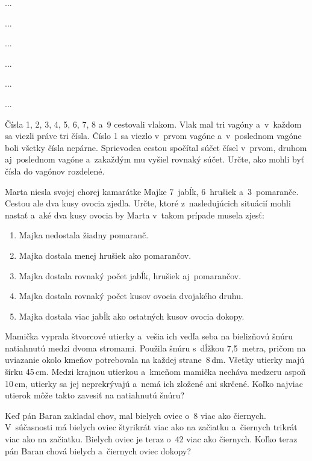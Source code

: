 ﻿{%
...}

{%
...}

{%
...}

{%
...}

{%
...}

{%
...}

{%
Čísla 1, 2, 3, 4, 5, 6, 7, 8 a~9 cestovali vlakom.
Vlak mal tri vagóny a~v~každom sa viezli práve tri čísla.
Číslo 1 sa viezlo v~prvom vagóne a~v~poslednom vagóne boli všetky čísla nepárne.
Sprievodca cestou spočítal súčet čísel v~prvom, druhom aj~poslednom vagóne a~zakaždým mu vyšiel rovnaký súčet.
Určte, ako mohli byť čísla do vagónov rozdelené.
}

{%
Marta niesla svojej chorej kamarátke Majke 7~jabĺk, 6~hrušiek a~3~pomaranče.
Cestou ale dva kusy ovocia zjedla.
Určte, ktoré z~nasledujúcich situácií mohli nastať a~aké dva kusy ovocia by
Marta v~takom prípade musela zjesť:
\begin{enumerate}\alphatrue
\item Majka nedostala žiadny pomaranč.
\item Majka dostala menej hrušiek ako pomarančov.
\item Majka dostala rovnaký počet jabĺk, hrušiek aj~pomarančov.
\item Majka dostala rovnaký počet kusov ovocia dvojakého druhu.
\item Majka dostala viac jabĺk ako ostatných kusov ovocia dokopy.
\end{enumerate}
}

{%
Mamička vyprala štvorcové utierky a~vešia ich vedľa seba na bielizňovú šnúru natiahnutú medzi dvoma stromami.
Použila šnúru s~dĺžkou 7{,}5~metra, pričom na uviazanie okolo kmeňov potrebovala na každej strane~8\,dm.
Všetky utierky majú šírku 45\,cm.
Medzi krajnou utierkou a~kmeňom mamička necháva medzeru aspoň 10\,cm, utierky sa jej neprekrývajú
a~nemá ich zložené ani skrčené.
Koľko najviac utierok môže takto zavesiť na natiahnutú šnúru?
}

{%
Keď pán Baran zakladal chov, mal bielych oviec o~8 viac ako čiernych.
V~súčasnosti má bielych oviec štyrikrát viac ako na začiatku a~čiernych trikrát viac ako na začiatku.
Bielych oviec je teraz o~42 viac ako čiernych.
Koľko teraz pán Baran chová bielych a~čiernych oviec dokopy?
}


